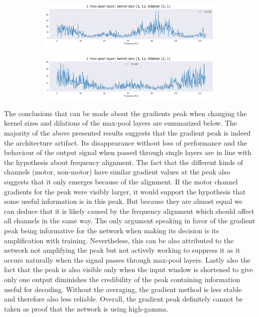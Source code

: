 \begin{figure}
\centering
\begin{subfigure}[b]{\textwidth}
   \includegraphics[width=1\linewidth]{img/ch4/absVel-maxpool-k3-d3}
   \caption{}
   \label{fig:Ng1} 
\end{subfigure}

\begin{subfigure}[b]{\textwidth}
   \includegraphics[width=1\linewidth]{img/ch4/absVel-maxpool-k3-d2}
   \caption{}
   \label{fig:Ng2}
\end{subfigure}

\caption[]{}
\end{figure}\label{fig:max-pool-changes}

The conclusions that can be made about the gradients peak when changing the kernel sizes and dilations of the max-pool layers are summarized below.
The majority of the above presented results suggests that the gradient peak is indeed the architecture artifact.
Its disappearance without loss of performance and the behaviour of the output signal when passed through single layers are in line with the hypothesis about frequency alignment.
The fact that the different kinds of channels (motor, non-motor) have similar gradient values at the peak also suggests that it only emerges because of the alignment.
If the motor channel gradients for the peak were visibly larger, it would support the hypothesis that some useful information is in this peak.
But because they are almost equal we can deduce that it is likely caused by the frequency alignment which should affect all channels in the same way.
The only argument speaking in favor of the gradient peak being informative for the network when making its decision is its amplification with training.
Nevertheless, this can be also attributed to the network not amplifying the peak but not actively working to suppress it as it occurs naturally when the signal passes through max-pool layers.
Lastly also the fact that the peak is also visible only when the input window is shortened to give only one output diminishes the credibility of the peak containing information useful for decoding.
Without the averaging, the gradient method is less stable and therefore also less reliable.
Overall, the gradient peak definitely cannot be taken as proof that the network is using high-gamma.

